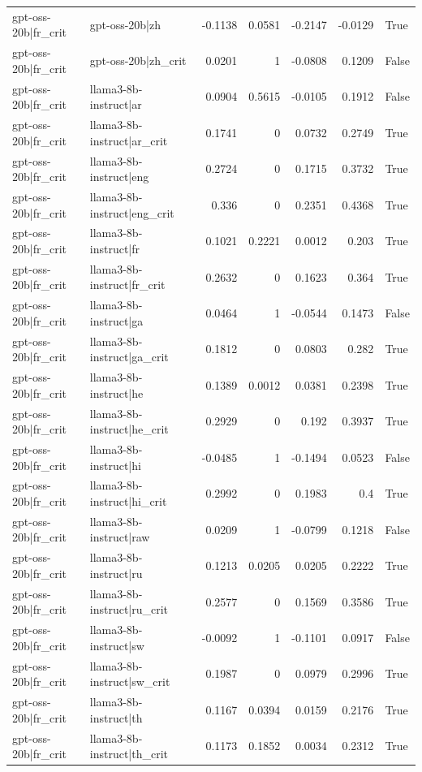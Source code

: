 \begin{table}
\begin{tabular}{l l r r r r l}
gpt-oss-20b|fr_crit & gpt-oss-20b|zh & -0.1138 & 0.0581 & -0.2147 & -0.0129 & True \\
gpt-oss-20b|fr_crit & gpt-oss-20b|zh_crit & 0.0201 & 1 & -0.0808 & 0.1209 & False \\
gpt-oss-20b|fr_crit & llama3-8b-instruct|ar & 0.0904 & 0.5615 & -0.0105 & 0.1912 & False \\
gpt-oss-20b|fr_crit & llama3-8b-instruct|ar_crit & 0.1741 & 0 & 0.0732 & 0.2749 & True \\
gpt-oss-20b|fr_crit & llama3-8b-instruct|eng & 0.2724 & 0 & 0.1715 & 0.3732 & True \\
gpt-oss-20b|fr_crit & llama3-8b-instruct|eng_crit & 0.336 & 0 & 0.2351 & 0.4368 & True \\
gpt-oss-20b|fr_crit & llama3-8b-instruct|fr & 0.1021 & 0.2221 & 0.0012 & 0.203 & True \\
gpt-oss-20b|fr_crit & llama3-8b-instruct|fr_crit & 0.2632 & 0 & 0.1623 & 0.364 & True \\
gpt-oss-20b|fr_crit & llama3-8b-instruct|ga & 0.0464 & 1 & -0.0544 & 0.1473 & False \\
gpt-oss-20b|fr_crit & llama3-8b-instruct|ga_crit & 0.1812 & 0 & 0.0803 & 0.282 & True \\
gpt-oss-20b|fr_crit & llama3-8b-instruct|he & 0.1389 & 0.0012 & 0.0381 & 0.2398 & True \\
gpt-oss-20b|fr_crit & llama3-8b-instruct|he_crit & 0.2929 & 0 & 0.192 & 0.3937 & True \\
gpt-oss-20b|fr_crit & llama3-8b-instruct|hi & -0.0485 & 1 & -0.1494 & 0.0523 & False \\
gpt-oss-20b|fr_crit & llama3-8b-instruct|hi_crit & 0.2992 & 0 & 0.1983 & 0.4 & True \\
gpt-oss-20b|fr_crit & llama3-8b-instruct|raw & 0.0209 & 1 & -0.0799 & 0.1218 & False \\
gpt-oss-20b|fr_crit & llama3-8b-instruct|ru & 0.1213 & 0.0205 & 0.0205 & 0.2222 & True \\
gpt-oss-20b|fr_crit & llama3-8b-instruct|ru_crit & 0.2577 & 0 & 0.1569 & 0.3586 & True \\
gpt-oss-20b|fr_crit & llama3-8b-instruct|sw & -0.0092 & 1 & -0.1101 & 0.0917 & False \\
gpt-oss-20b|fr_crit & llama3-8b-instruct|sw_crit & 0.1987 & 0 & 0.0979 & 0.2996 & True \\
gpt-oss-20b|fr_crit & llama3-8b-instruct|th & 0.1167 & 0.0394 & 0.0159 & 0.2176 & True \\
gpt-oss-20b|fr_crit & llama3-8b-instruct|th_crit & 0.1173 & 0.1852 & 0.0034 & 0.2312 & True \\

\end{tabular}
\end{table}
